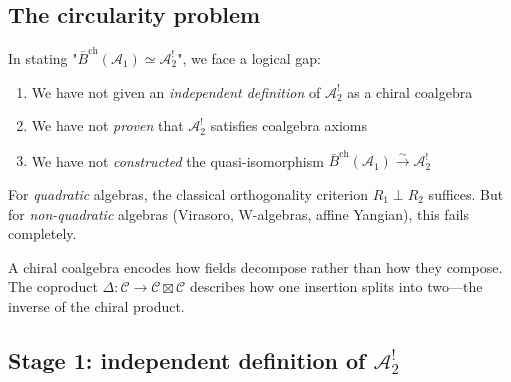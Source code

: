 \subsection{The circularity problem}

\begin{problem}\label{prob:circularity}
In stating "$\bar{B}^{\text{ch}}(\mathcal{A}_1) \simeq \mathcal{A}_2^!$", we face a logical gap:
\begin{enumerate}
\item We have not given an \emph{independent definition} of $\mathcal{A}_2^!$ as a chiral coalgebra
\item We have not \emph{proven} that $\mathcal{A}_2^!$ satisfies coalgebra axioms
\item We have not \emph{constructed} the quasi-isomorphism $\bar{B}^{\text{ch}}(\mathcal{A}_1) \xrightarrow{\sim} \mathcal{A}_2^!$
\end{enumerate}

For \emph{quadratic} algebras, the classical orthogonality criterion $R_1 \perp R_2$ suffices. But for \emph{non-quadratic} algebras (Virasoro, W-algebras, affine Yangian), this fails completely.

\end{problem}

\begin{remark}
A chiral coalgebra encodes how fields decompose rather than how they compose. The coproduct $\Delta: \mathcal{C} \to \mathcal{C} \boxtimes \mathcal{C}$ describes how one insertion splits into two---the inverse of the chiral product.
\end{remark}


\subsection{\texorpdfstring{Stage 1: independent definition of $\mathcal{A}_2^!$}{Stage 1: independent definition of A-2!}}

